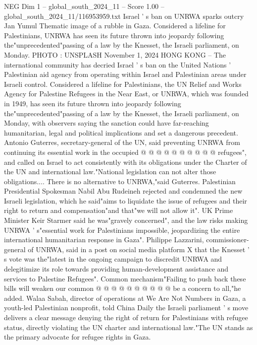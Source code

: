 \begin{textsample}{NEG Dim 1 – global\_south\_2024\_11 – Score 1.00 – global\_south\_2024\_11/116953959.txt}  \label{ex:f1_neg_279}
Israel ' s ban on UNRWA sparks outcry Jan Yumul Thematic image of a rubble in Gaza.
Considered a lifeline for Palestinians, UNRWA has seen its future thrown into jeopardy following the"unprecedented"passing of a law by the Knesset, the Israeli parliament, on Monday.
PHOTO : UNSPLASH November 1, 2024 HONG KONG -- The international community has decried Israel ' s ban on the United Nations ' Palestinian aid agency from operating within Israel and Palestinian areas under Israeli control.
Considered a lifeline for Palestinians, the UN Relief and Works Agency for Palestine Refugees in the Near East, or UNRWA, which was founded in 1949, has seen its future thrown into jeopardy following the"unprecedented"passing of a law by the Knesset, the Israeli parliament, on Monday, with observers saying the sanction could have far-reaching humanitarian, legal and political implications and set a dangerous precedent.
Antonio Guterres, secretary-general of the UN, said preventing UNRWA from continuing its essential work in the occupied @ @ @ @ @ @ @ @ @ @ refugees", and called on Israel to act consistently with its obligations under the Charter of the UN and international law."National legislation can not alter those obligations....
There is no alternative to UNRWA,"said Guterres.
Palestinian Presidential Spokesman Nabil Abu Rudeineh rejected and condemned the new Israeli legislation, which he said"aims to liquidate the issue of refugees and their right to return and compensation"and that"we will not allow it".
UK Prime Minister Keir Starmer said he was"gravely concerned", and the law risks making UNRWA ' s"essential work for Palestinians impossible, jeopardizing the entire international humanitarian response in Gaza".
Philippe Lazzarini, commissioner-general of UNRWA, said in a post on social media platform X that the Knesset ' s vote was the"latest in the ongoing campaign to discredit UNRWA and delegitimize its role towards providing human-development assistance and services to Palestine Refugees".
Common mechanism"Failing to push back these bills will weaken our common @ @ @ @ @ @ @ @ @ @ be a concern to all,"he added.
Walaa Sabah, director of operations at We Are Not Numbers in Gaza, a youth-led Palestinian nonprofit, told China Daily the Israeli parliament ' s move delivers a clear message denying the right of return for Palestinians with refugee status, directly violating the UN charter and international law."The UN stands as the primary advocate for refugee rights in Gaza.

\end{textsample}
